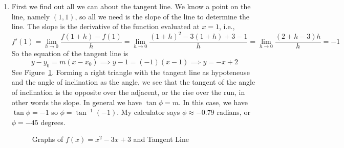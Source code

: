 \documentclass{article}
\begin{document}
\begin{enumerate}
\item First we find out all we can about the tangent line.  We know a
  point on the line, namely $(1,1)$, so all we need is the slope of
  the line to determine the line.  The slope is the derivative of the
  function evaluated at $x=1$, i.e.,
  \begin{equation*}
    f'(1) = \lim_{h\to 0} \frac{f(1+h)-f(1)}{h}
    = \lim_{h\to 0} \frac{(1+h)^2-3(1+h)+3-1}{h} 
    = \lim_{h\to 0} \frac{(2+h-3)h}{h} = -1
  \end{equation*}
  So the equation of the tangent line is 
  \begin{equation*}
    y-y_0 = m(x-x_0) \implies y-1 = (-1) (x-1) \implies y=-x+2
  \end{equation*}
  See Figure~\ref{fig:phi}.  Forming a right triangle with the tangent
  line as hypoteneuse and the angle of inclination as the angle, we
  see that the tangent of the angle of inclination is the opposite
  over the adjacent, or the rise over the run, in other words the
  slope.  In general we have $\tan \phi = m$.  In this case, we have
  $\tan \phi = -1$ so $\phi = \tan^{-1} (-1)$.  My calculator says
  $\phi \approx -0.79$ radians, or $\phi = -45$ degrees.
  \begin{figure}[htbp]
    \centering
    \caption{Graphs of $f(x)=x^2-3x+3$ and Tangent Line}
    \label{fig:phi}
  \end{figure}
\end{enumerate}
\end{document}
